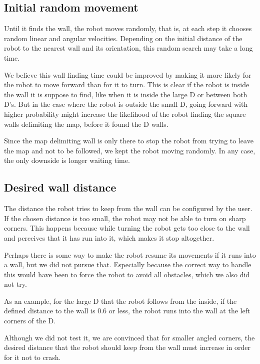 \documentclass[10pt,journal,compsoc]{IEEEtran}
\begin{document}
\subsection{Initial random movement}

Until it finds the wall, the robot moves randomly, that is, at each step it chooses random linear and angular velocities. Depending on the initial distance of the robot to the nearest wall and its orientation, this random search may take a long time. 

We believe this wall finding time could be improved by making it more likely for the robot to move forward than for it to turn. This is clear if the robot is inside the wall it is suppose to find, like when it is inside the large D or between both D's. But in the case where the robot is outside the small D, going forward with higher probability might increase the likelihood of the robot finding the square walls delimiting the map, before it found the D walls.

Since the map delimiting wall is only there to stop the robot from trying to leave the map and not to be followed, we kept the robot moving randomly. In any case, the only downside is longer waiting time.

\subsection{Desired wall distance}

The distance the robot tries to keep from the wall can be configured by the user. If the chosen distance is too small, the robot may not be able to turn on sharp corners. This happens because while turning the robot gets too close to the wall and perceives that it has run into it, which makes it stop altogether.

Perhaps there is some way to make the robot resume its movements if it runs into a wall, but we did not pursue that. Especially because the correct way to handle this would have been to force the robot to avoid all obstacles, which we also did not try.

As an example, for the large D that the robot follows from the inside, if the defined distance to the wall is 0.6 or less, the robot runs into the wall at the left corners of the D.

Although we did not test it, we are convinced that for smaller angled corners, the desired distance that the robot should keep from the wall must increase in order for it not to crash.
\end{document}
